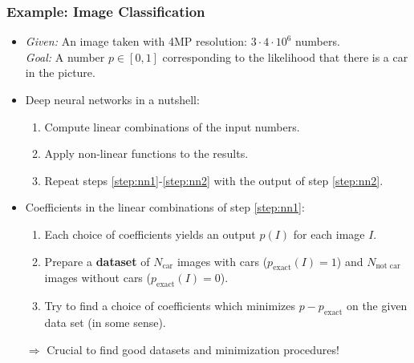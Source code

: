 \documentclass[10pt,hyperref={pdfpagelabels=false}]{beamer}
\begin{document}
\begin{frame}
    \frametitle{Example: Image Classification}
    \begin{itemize}
        \item \emph{Given:} An image taken with 4MP resolution: $3\cdot 4\cdot 10^6$ numbers.\\
        \emph{Goal:} A number $p\in[0,1]$ corresponding to the likelihood that there is a car in the picture.
        \item Deep neural networks in a nutshell:
        \begin{enumerate}
            \item \label{step:nn1}Compute linear combinations of the input numbers.
            \item \label{step:nn2}Apply non-linear functions to the results.
            \item Repeat steps \ref{step:nn1}-\ref{step:nn2} with the output of step \ref{step:nn2}.
        \end{enumerate}
        \item Coefficients in the linear combinations of step \ref{step:nn1}:
        \begin{enumerate}
            \item Each choice of coefficients yields an output $p(I)$ for each image $I$.
            \item Prepare a {\bf dataset} of $N_{\text{car}}$ images with cars ($p_{\text{exact}}(I)=1$) and $N_{\text{not car}}$ images without cars ($p_{\text{exact}}(I)=0$).
            \item Try to find a choice of coefficients which minimizes $p-p_{\text{exact}}$ on the given data set (in some sense).
        \end{enumerate}
        \item[$\Rightarrow$] Crucial to find good datasets and minimization procedures!
    \end{itemize}
\end{frame}
\end{document}
